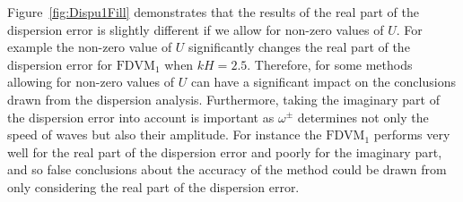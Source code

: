 Figure~\ref{fig:Dispu1Fill} demonstrates that the results of the real part of the dispersion error is slightly different if we allow for non-zero values of $U$. For example the non-zero value of $U$ significantly changes the real part of the dispersion error for $\text{FDVM}_1$ when $kH = 2.5$. Therefore, for some methods allowing for non-zero values of $U$ can have a significant impact on the conclusions drawn from the dispersion analysis. Furthermore, taking the imaginary part of the dispersion error into account is important as $\omega^\pm$ determines not only the speed of waves but also their amplitude. For instance the $\text{FDVM}_1$ performs very well for the real part of the dispersion error and poorly for the imaginary part, and so false conclusions about the accuracy of the method could be drawn from only considering the real part of the dispersion error.
